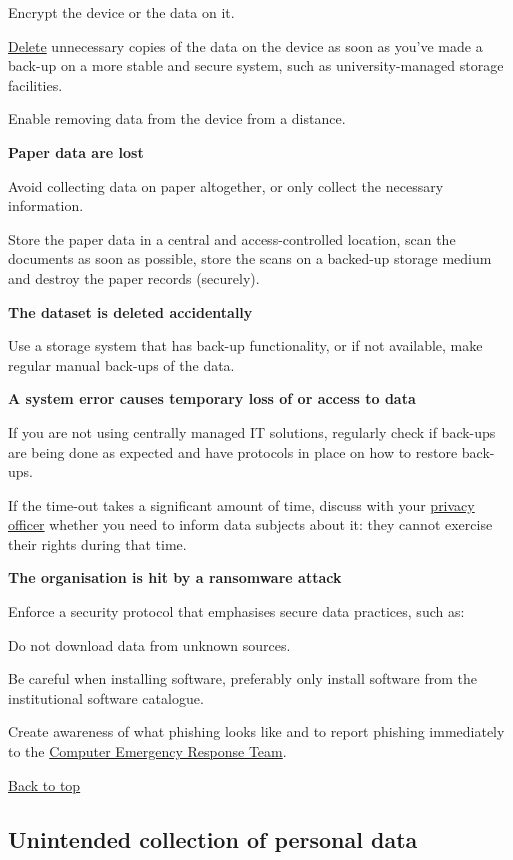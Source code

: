 \documentclass[
]{book}
\begin{document}
Encrypt the device or the data on it.

\protect\hyperlink{deleting-personal-data}{Delete} unnecessary copies of the data on the device as soon as you've made a back-up on a more stable and secure system, such as university-managed storage facilities.

Enable removing data from the device from a distance.

\textbf{Paper data are lost}

Avoid collecting data on paper altogether, or only collect the necessary information.

Store the paper data in a central and access-controlled location, scan the documents as soon as possible, store the scans on a backed-up storage medium and destroy the paper records (securely).

\textbf{The dataset is deleted accidentally}

Use a storage system that has back-up functionality, or if not available, make regular manual back-ups of the data.

\textbf{A system error causes temporary loss of or access to data}

If you are not using centrally managed IT solutions, regularly check if back-ups are being done as expected and have protocols in place on how to restore back-ups.

If the time-out takes a significant amount of time, discuss with your \protect\hyperlink{support}{privacy officer} whether you need to inform data subjects about it: they cannot exercise their rights during that time.

\textbf{The organisation is hit by a ransomware attack}

Enforce a security protocol that emphasises secure data practices, such as:

Do not download data from unknown sources.

Be careful when installing software, preferably only install software from the institutional software catalogue.

Create awareness of what phishing looks like and to report phishing immediately to the \href{https://intranet.uu.nl/en/security/information-security-computer-misuse-or-report-incident-cert}{Computer Emergency Response Team}.

\protect\hyperlink{example-risks}{Back to top}

\hypertarget{unintended-collection}{%
\subsection{Unintended collection of personal data}\label{unintended-collection}}
\end{document}
